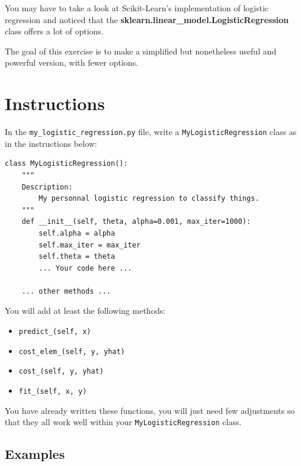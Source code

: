 \documentclass{42-en}
\begin{document}
You may have to take a look at Scikit-Learn's implementation of logistic regression and noticed that the \textbf{sklearn.linear\_model.LogisticRegression} class offers a lot of options.

The goal of this exercise is to make a simplified but nonetheless useful and powerful version, with fewer options.

\section*{Instructions}
In the \texttt{my\_logistic\_regression.py} file, write a \texttt{MyLogisticRegression} class as in the instructions below:

\begin{verbatim}
class MyLogisticRegression():
	"""
	Description:
		My personnal logistic regression to classify things.
	"""
    def __init__(self, theta, alpha=0.001, max_iter=1000):
        self.alpha = alpha
        self.max_iter = max_iter
        self.theta = theta
        ... Your code here ...

	... other methods ...
\end{verbatim}

You will add at least the following methods:
\begin{itemize}
  \item \texttt{predict\_(self, x)}
  \item \texttt{cost\_elem\_(self, y, yhat)}
  \item \texttt{cost\_(self, y, yhat)}
  \item \texttt{fit\_(self, x, y)}
\end{itemize}

You have already written these functions, you will just need few adjustments so that they all work well within your \texttt{MyLogisticRegression} class.

\subsection*{Examples}
\end{document}
